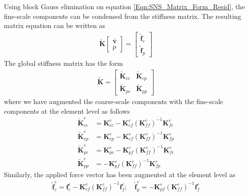 \documentclass[11pt]{amsart}
\begin{document}
Using block Gauss elimination on equation \eqref{Eqn:SNS_Matrix_Form_Resid}, the fine-scale components can be condensed from the stiffness matrix.  The resulting matrix equation can be written as
\begin{align}
\label{Eqn:SNS_Condensed_Resid}
  \widetilde{\boldsymbol{K}} \left[ \begin{array}{c}  \bar{\boldsymbol{v}} \\
  p \end{array} \right] = \left[ \begin{array}{c}  \widetilde{\boldsymbol{f}}_{c} \\
\widetilde{\boldsymbol{f}}_{p} \end{array} \right]
\end{align}
The global stiffness matrix has the form
\begin{align}
\label{eq:CondensedLinearStiffness}
\widetilde{\boldsymbol{K}} = \left[ \begin{array}{cc} \widetilde{\boldsymbol{K}}_{cc} & \widetilde{\boldsymbol{K}}_{cp}  \\
 \widetilde{\boldsymbol{K}}_{pc}  & \widetilde{\boldsymbol{K}}_{pp} \end{array} \right] 
\end{align}
where we have augmented the coarse-scale components with the fine-scale components at the element level as follows
\begin{align}
\label{eq:LinearStiffness_Defined}
\widetilde{\boldsymbol{K}}_{cc}^e &= \boldsymbol{K}_{cc}^e - \boldsymbol{K}_{cf}^e(\boldsymbol{K}_{ff}^e)^{-1}\boldsymbol{K}_{fc}^e \\
\widetilde{\boldsymbol{K}}_{cp}^e &= \boldsymbol{K}_{cp}^e - \boldsymbol{K}_{cf}^e(\boldsymbol{K}_{ff}^e)^{-1}\boldsymbol{K}_{fp}^e \\
\widetilde{\boldsymbol{K}}_{pc}^e &= \boldsymbol{K}_{pc}^e - \boldsymbol{K}_{pf}^e(\boldsymbol{K}_{ff}^e)^{-1}\boldsymbol{K}_{fc}^e \\
\widetilde{\boldsymbol{K}}_{pp}^e &=  - \boldsymbol{K}_{pf}^e(\boldsymbol{K}_{ff}^e)^{-1}\boldsymbol{K}_{fp}^e 
\end{align}
Similarly, the applied force vector has been augmented at the element level as
\begin{align}
\label{eq:LinearForces_Defined}
  \widetilde{\boldsymbol{f}}_{c}^e = \boldsymbol{f}_{c}^e - \boldsymbol{K}_{cf}^e(\boldsymbol{K}_{ff}^e)^{-1}\boldsymbol{f}_{f}^e ; \quad \widetilde{\boldsymbol{f}}_{p}^e = - \boldsymbol{K}_{pf}^e(\boldsymbol{K}_{ff}^e)^{-1}\boldsymbol{f}_{f}^e
\end{align}
\end{document}
